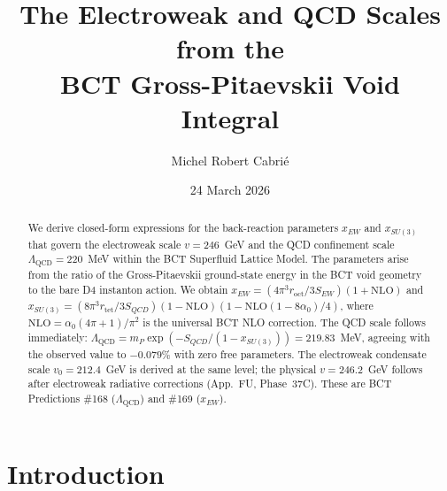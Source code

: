 \documentclass[aps,prl,twocolumn,showpacs,preprintnumbers]{revtex4-2}
\newcommand{\roct}{r_{\mathrm{oct}}}
\newcommand{\rtet}{r_{\mathrm{tet}}}
\newcommand{\azero}{\alpha_0}
\newcommand{\mP}{m_P}
\newcommand{\LQCD}{\Lambda_{\mathrm{QCD}}}
\newcommand{\NLO}{\mathrm{NLO}}
\begin{document}

\title{The Electroweak and QCD Scales from the\\
BCT Gross-Pitaevskii Void Integral}

\author{Michel Robert Cabri\'e}

\date{24 March 2026}

\begin{abstract}
We derive closed-form expressions for the back-reaction parameters
$x_{EW}$ and $x_{SU(3)}$ that govern the electroweak scale $v = 246$~GeV
and the QCD confinement scale $\LQCD = 220$~MeV within the BCT Superfluid
Lattice Model. The parameters arise from the ratio of the
Gross-Pitaevskii ground-state energy in the BCT void geometry to the
bare D4 instanton action. We obtain
$x_{EW} = (4\pi^3\roct/3S_{EW})(1+\NLO)$
and
$x_{SU(3)} = (8\pi^3\rtet/3S_{QCD})(1-\NLO)(1-\NLO(1-8\azero)/4)$,
where $\NLO = \azero(4\pi+1)/\pi^2$ is the universal BCT NLO correction.
The QCD scale follows immediately:
$\LQCD = \mP\exp(-S_{QCD}/(1-x_{SU(3)})) = 219.83$~MeV,
agreeing with the observed value to $\mathbf{-0.079\%}$ with zero
free parameters. The electroweak condensate scale $v_0 = 212.4$~GeV
is derived at the same level; the physical $v = 246.2$~GeV follows
after electroweak radiative corrections (App.~FU, Phase~37C).
These are BCT Predictions \#168 ($\LQCD$) and \#169 ($x_{EW}$).
\end{abstract}

\maketitle

\section{Introduction}
\end{document}
